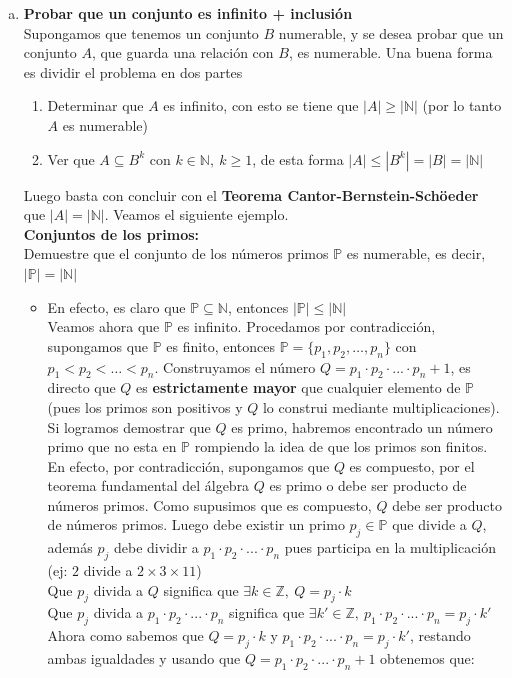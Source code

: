 \documentclass[letterpaper,12pt]{article}
\newcommand{\N}{\mathbb N}
\newcommand{\Z}{\mathbb Z}
\theoremstyle{plain}
\begin{document}
\begin{enumerate}[a)]
    
    \item \textbf{Probar que un conjunto es infinito + inclusión}\\
    Supongamos que tenemos un conjunto $B$ numerable, y se desea probar que un conjunto $A$, que guarda una relación con $B$, es numerable. Una buena forma es dividir el problema en dos partes
    \begin{enumerate}
        \item Determinar que $A$ es infinito, con esto se tiene que $|A|\geq |\N|$ (por lo tanto $A$ es numerable)
        \item Ver que $A\subseteq B^{k}$ con $k\in \N, ~ k\geq 1$, de esta forma $|A|\leq |B^{k}|=|B|=|\N|$
    \end{enumerate}
    Luego basta con concluir con el \textbf{Teorema Cantor-Bernstein-Schöeder} que $|A|=|\N|$. Veamos el siguiente ejemplo.\\[2mm]
    \textbf{Conjuntos de los primos:}\\
    Demuestre que el conjunto de los números primos $\mathbb{P}$ es numerable, es decir, $| \mathbb{P}|=|\N|$
    \begin{itemize}
        \item En efecto, es claro que $\mathbb{P}\subseteq \N$, entonces $|\mathbb{P}|\leq |\N|$\\
    Veamos ahora que $\mathbb{P}$ es infinito. Procedamos por contradicción, supongamos que $\mathbb{P}$ es finito, entonces $\mathbb{P}=\{p_1,p_2,\dots,p_{n}\}$ con $p_1<p_2<\dots<p_n$. Construyamos el número $Q=p_1\cdot p_2\cdot ... \cdot p_n +1$, es directo que $Q$ es \textbf{estrictamente mayor} que cualquier elemento de $\mathbb{P}$ (pues los primos son positivos y $Q$ lo construi mediante multiplicaciones). Si logramos demostrar que $Q$ es primo, habremos encontrado un número primo que no esta en $\mathbb{P}$ rompiendo la idea de que los primos son finitos.\\
    En efecto, por contradicción, supongamos que $Q$ es compuesto, por el teorema fundamental del álgebra $Q$ es primo o debe ser producto de números primos. Como supusimos que es compuesto, $Q$ debe ser producto de números primos. Luego debe existir un primo $ p_j \in \mathbb{P}$ que divide a $Q$, además $p_j$ debe dividir a $p_1\cdot p_2\cdot ... \cdot p_n$ pues participa en la multiplicación (ej: $2$ divide a $2\times3\times11$) \\[5mm]
    
    Que $p_j$ divida a $Q$ significa que $\exists k\in \Z,~ Q=p_j\cdot k$\\
    Que $p_j$ divida a $p_1\cdot p_2\cdot ... \cdot p_n$ significa que $\exists k'\in \Z,~ p_1\cdot p_2\cdot ... \cdot p_n =p_j\cdot k'$\\[5mm]
    Ahora como sabemos que $Q=p_j\cdot k$ y $p_1\cdot p_2\cdot ... \cdot p_n =p_j\cdot k'$, restando ambas igualdades y usando que $Q=p_1\cdot p_2\cdot ... \cdot p_n +1$ obtenemos que:
    

\end{itemize}
\end{enumerate}
\end{document}
